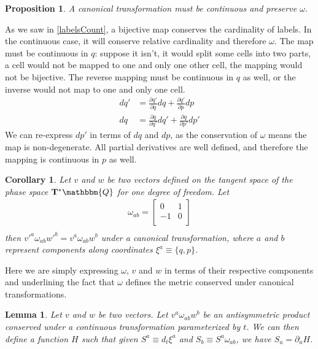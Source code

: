 \documentclass[aps,pra,10pt,twocolumn,floatfix,nofootinbib]{revtex4-1}
\newtheorem{cor}[thm]{Corollary}
\newtheorem{lem}[thm]{Lemma}
\newtheorem{prop}[thm]{Proposition}
\theoremstyle{definition}
\begin{document}
\begin{prop}\label{continuousMapping}
A canonical transformation must be continuous and preserve $\omega$.
\end{prop}

As we saw in \ref{labelsCount}, a bijective map conserves the cardinality of labels. In the continuous case, it will conserve relative cardinality and therefore $\omega$. The map must be continuous in $q$: suppose it isn't, it would split some cells into two parts, a cell would not be mapped to one and only one other cell, the mapping would not be bijective. The reverse mapping must be continuous in $q$ as well, or the inverse would not map to one and only one cell.
\begin{align*}
dq' &= \frac{\partial q'}{\partial q} dq + \frac{\partial q'}{\partial p} dp \\
dq &= \frac{\partial q}{\partial q'} dq' + \frac{\partial q}{\partial p'} dp'
\end{align*}
We can re-express $dp'$ in terms of $dq$ and $dp$, as the conservation of $\omega$ means the map is non-degenerate. All partial derivatives are well defined, and therefore the mapping is continuous in $p$ as well.

\begin{cor}\label{sdofInvariant}
Let $v$ and $w$ be two vectors defined on the tangent space of the phase space $\mathbf{T}^*\mathbbm{Q}$ for one degree of freedom. Let
\begin{align*}
\omega_{ab} = \left[
  \begin{array}{cc}
    0 & 1 \\
    -1 & 0 \\
  \end{array}
\right] \\
\end{align*}
then $v'^{a} \omega_{ab} w'^{b}=v^{a} \omega_{ab} w^{b}$ under a canonical transformation, where $a$ and $b$ represent components along coordinates $\xi^{a} \equiv \{q,p\}$.
\end{cor}

Here we are simply expressing $\omega$, $v$ and $w$ in terms of their respective components and underlining the fact that $\omega$ defines the metric conserved under canonical transformations.

\begin{lem}\label{genAntisim}
Let $v$ and $w$ be two vectors. Let $v^{a} \omega_{ab} w^{b}$ be an antisymmetric product conserved under a continuous transformation parameterized by $t$. We can then define a function $H$ such that given $S^{a} \equiv d_{t}\xi^{a}$ and $S_{b} \equiv S^{a} \omega_{ab}$, we have $S_{a} = \partial_{a}H$.
\end{lem}
\end{document}
